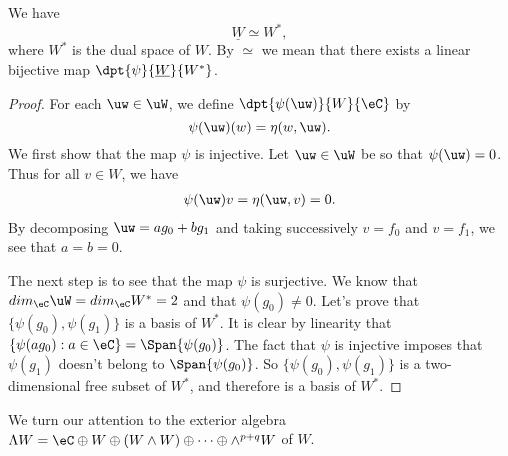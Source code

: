 \begin{proposition}
	We have
	\begin{equation}
		\underline{W}\simeq W^*,
	\end{equation}
	where $W^*$ is the dual space of $W$. By $\simeq$ we mean that there exists a linear bijective map $\dpt{\psi}{\underline{W}}{W^*}$.
\end{proposition}
\begin{proof}
	For each $\uw\in\uW$, we define $\dpt{\psi(\uw)}{W}{\eC}$ by
	\[
		\psi(\uw)(w)=\eta(w,\uw).
	\]
	We first show that the map $\psi$ is injective. Let $\uw\in\uW$ be so that $\psi(\uw)=0$. Thus for all $v\in W$, we have
	\begin{eqnarray}
		\label{3101r1}\psi(\uw)v=\eta(\uw,v)=0.
	\end{eqnarray}
	By decomposing $\uw=ag_0+bg_1$ and taking successively $v=f_0$ and $v=f_1$, we see that $a=b=0$.

	The next step is to see that the map $\psi$ is surjective. We know that $dim_{\eC}\uW=dim_{\eC}W^*=2$ and that $\psi(g_0)\neq 0$. Let's prove that $\{\psi(g_0),\psi(g_1)\}$ is a basis of $W^*$. It is clear by linearity that $\{\psi(ag_0):a\in\eC\}=\Span\{\psi(g_0)\}$. The fact that $\psi$ is injective  imposes that $\psi(g_1)$ doesn't belong to $\Span\{\psi(g_0)\}$. So $\{\psi(g_0),\psi(g_1)\}$ is a two-dimensional free subset of $W^*$, and therefore is a basis of $W^*$.
\end{proof}

We turn our attention to the exterior algebra $\Lambda W=\eC\oplus W\oplus(W\wedge W)\oplus\cdots\oplus\wedge^{p+q}W$ of $W$.

